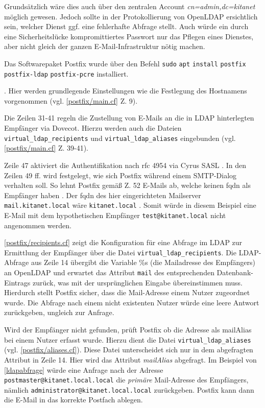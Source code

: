 Grundsätzlich wäre dies auch über den zentralen Account \textit{cn=admin,dc=kitanet} möglich gewesen. 
Jedoch sollte in der Protokollierung von OpenLDAP ersichtlich sein, welcher Dienst ggf. eine fehlerhafte Abfrage stellt. 
Auch würde ein durch eine Sicherheitslücke kompromittiertes Passwort nur das Pflegen eines Dienstes, aber nicht gleich der ganzen E-Mail-Infrastruktur nötig machen.

Das Softwarepaket Postfix wurde über den Befehl \verb+sudo+ \verb+apt+ \verb+install+ \verb+postfix+ \\ \verb+postfix-ldap+ \verb+postfix-pcre+ installiert. 

 \citep[][308]{Deimeke2019}.
Hier werden grundlegende Einstellungen wie die Festlegung des Hostnamens vorgenommen (vgl. \autoref{postfix/main.cf} Z. 9).

Die Zeilen 31-41 regeln die Zustellung von E-Mails an die in LDAP hinterlegten Empfänger via Dovecot. Hierzu werden auch die  Dateien \verb+virtual_ldap_recipients+ und \verb+virtual_ldap_aliases+ eingebunden (vgl. \autoref{postfix/main.cf} Z. 39-41).

Zeile 47 aktiviert die Authentifikation nach \ac{rfc} 4954 via Cyrus SASL \citep[vgl.][3]{rfc4954}.
In den Zeilen 49 ff. wird festgelegt, wie sich Postfix während einem SMTP-Dialog verhalten soll.
So lehnt Postfix \zb gemäß Z. 52 E-Mails ab, welche keinen \ac{fqdn} als Empfänger haben \citep[vgl.][]{postfixfqdn}. 
Der \ac{fqdn} des hier eingerichteten Mailserver \verb+mail.kitanet.local+ wäre \zb \verb+kitanet.local+ \citep[vgl.][]{fqdn}. 
Somit würde in diesem Beispiel eine E-Mail mit dem hypothetischen Empfänger \verb+test@kitanet.local+ nicht angenommen werden.

\autoref{postfix/recipients.cf} zeigt die Konfiguration für eine Abfrage im LDAP zur Ermittlung der Empfänger über die Datei \verb+virtual_ldap_recipients+.
Die LDAP-Abfrage aus Zeile 14 übergibt die Variable \%s (die Mailadresse des Empfängers) an OpenLDAP und erwartet das Attribut \verb+mail+ des entsprechenden Datenbank-Eintrags zurück, was mit der ursprünglichen Eingabe übereinstimmen muss. Hierdurch stellt Postfix sicher, dass die Mail-Adresse einem Nutzer zugeordnet wurde. Die Abfrage nach einem nicht existenten Nutzer würde eine leere Antwort zurückgeben, ungleich zur Anfrage.

Wird der Empfänger nicht gefunden, prüft Postfix ob die Adresse als mailAlias bei einem Nutzer erfasst wurde. Hierzu dient die Datei \verb+virtual_ldap_aliases+ (vgl. \autoref{postfix/aliases.cf}). 
Diese Datei unterscheidet sich nur in dem abgefragten Attribut in Zeile 14. 
Hier wird das Attribut \textit{mailAlias} abgefragt. 
Im Beispiel von \autoref{ldapabfrage} würde eine Anfrage nach der Adresse \verb+postmaster@kitanet.local.local+ die \textit{primäre} Mail-Adresse des Empfängers, nämlich \verb+administrator@kitanet.local.local+ zurückgeben. 
Postfix kann dann die E-Mail in das korrekte Postfach ablegen.

